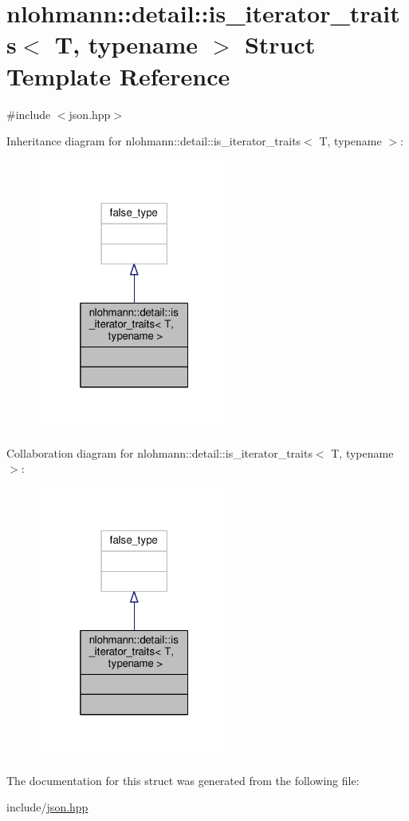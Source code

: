 \hypertarget{structnlohmann_1_1detail_1_1is__iterator__traits}{}\section{nlohmann\+:\+:detail\+:\+:is\+\_\+iterator\+\_\+traits$<$ T, typename $>$ Struct Template Reference}
\label{structnlohmann_1_1detail_1_1is__iterator__traits}


{\ttfamily \#include $<$json.\+hpp$>$}



Inheritance diagram for nlohmann\+:\+:detail\+:\+:is\+\_\+iterator\+\_\+traits$<$ T, typename $>$\+:
\nopagebreak
\begin{figure}[H]
\begin{center}
\leavevmode
\includegraphics[width=181pt]{structnlohmann_1_1detail_1_1is__iterator__traits__inherit__graph}
\end{center}
\end{figure}


Collaboration diagram for nlohmann\+:\+:detail\+:\+:is\+\_\+iterator\+\_\+traits$<$ T, typename $>$\+:
\nopagebreak
\begin{figure}[H]
\begin{center}
\leavevmode
\includegraphics[width=181pt]{structnlohmann_1_1detail_1_1is__iterator__traits__coll__graph}
\end{center}
\end{figure}


The documentation for this struct was generated from the following file\+:\begin{DoxyCompactItemize}
\item 
include/\hyperlink{json_8hpp}{json.\+hpp}\end{DoxyCompactItemize}

